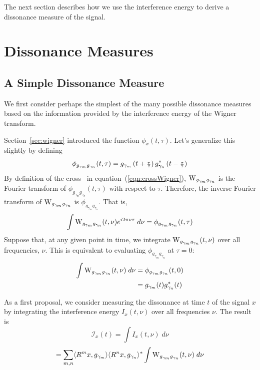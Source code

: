 The next section describes how we use the interference energy to derive a dissonance
measure of the signal.

\section{Dissonance Measures}
\def\tpull{\left(t+\halftau\right)}
\def\tpush{\left(t-\halftau\right)}
\def\I{\mathcal{I}}
\subsection{A Simple Dissonance Measure}
We first consider perhaps the simplest of the many possible dissonance measures
based on the information provided by the interference energy of the Wigner
transform. 

Section~\ref{sec:wigner} introduced the function
$\phi_x(t,\tau)$.  Let's generalize this slightly by defining
\[
\phi_{g_{\gamma_m}g_{\gamma_n}}(t,\tau) 
= g_{\gamma_m}\tpull g^*_{\gamma_n}\tpush
\]
By definition of the cross \WT\ in equation~(\ref{eqn:crossWigner}),
$\operatorname{W}_{g_{\gamma_m}g_{\gamma_n}}$ is the Fourier transform of 
$\phi_{g_{\gamma_m}g_{\gamma_n}}(t,\tau)$ 
with respect to $\tau$.  Therefore, the inverse Fourier 
transform of $\operatorname{W}_{g_{\gamma_m}g_{\gamma_n}}$ is
$\phi_{g_{\gamma_m}g_{\gamma_n}}$. 
That is,
\[
\int
\operatorname{W}_{g_{\gamma_m}g_{\gamma_n}}(t,\nu) e^{i2\pi\nu\tau}\;d\nu
= \phi_{g_{\gamma_m}g_{\gamma_n}}(t,\tau) 
\]
Suppose that, at any given point in time, we integrate
$\operatorname{W}_{g_{\gamma_m}g_{\gamma_n}}(t,\nu)$ over all frequencies, $\nu$.  This is
equivalent to evaluating $\phi_{g_{\gamma_m}g_{\gamma_n}}$ at $\tau = 0$:
\begin{align}
\int
\operatorname{W}_{g_{\gamma_m}g_{\gamma_n}}(t,\nu)\;d\nu
&=\phi_{g_{\gamma_m}g_{\gamma_n}}(t,0)\nonumber \\
&= g_{\gamma_m}(t)g^*_{\gamma_n}(t) \label{eq:intWV}
\end{align}

As a first proposal, we consider measuring the dissonance at time $t$ of the
signal $x$ by integrating the interference energy
$I_x(t,\nu)$ over all frequencies $\nu$.  The result %
is 
\begin{equation}\label{eq:specialI}
\I_x(t) = \int I_x(t,\nu)\; d\nu
\end{equation}
\[
=\sum_{m, n}
    \langle R^mx,g_{\gamma_m}\rangle \langle R^nx,g_{\gamma_n}\rangle^*
      \int \operatorname{W}_{g_{\gamma_m}g_{\gamma_n}}(t,\nu)\; d\nu
\]

